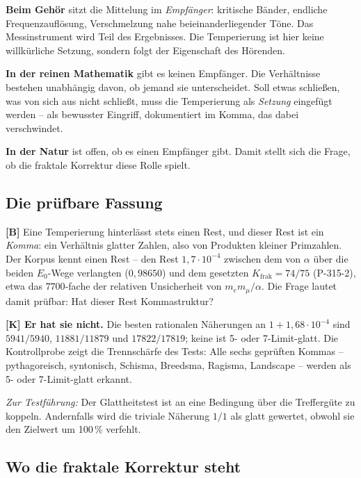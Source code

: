\textbf{Beim Geh\"or} sitzt die Mittelung im \emph{Empf\"anger}:
kritische B\"ander, endliche Frequenzaufl\"osung, Verschmelzung nahe
beieinanderliegender T\"one. Das Messinstrument wird Teil des
Ergebnisses. Die Temperierung ist hier keine willk\"urliche Setzung,
sondern folgt der Eigenschaft des H\"orenden.

\textbf{In der reinen Mathematik} gibt es keinen Empf\"anger. Die
Verh\"altnisse bestehen unabh\"angig davon, ob jemand sie unterscheidet.
Soll etwas schlie\ss en, was von sich aus nicht schlie\ss t, muss die
Temperierung als \emph{Setzung} eingef\"ugt werden -- als bewusster
Eingriff, dokumentiert im Komma, das dabei verschwindet.

\textbf{In der Natur} ist offen, ob es einen Empf\"anger gibt. Damit
stellt sich die Frage, ob die fraktale Korrektur diese Rolle spielt.

\subsection{Die pr\"ufbare Fassung}

\textbf{[B]} Eine Temperierung hinterl\"asst stets einen Rest, und
dieser Rest ist ein \emph{Komma}: ein Verh\"altnis glatter Zahlen, also
von Produkten kleiner Primzahlen. Der Korpus kennt einen Rest -- den
Rest $1{,}7\cdot10^{-4}$ zwischen dem von $\alpha$ \"uber die beiden $E_0$-Wege verlangten
($0{,}98650$) und dem gesetzten $K_\text{frak} = 74/75$ (P-315-2), etwa das $7700$-fache der relativen
Unsicherheit von $m_e m_\mu/\alpha$. Die
Frage lautet damit pr\"ufbar: Hat dieser Rest Kommastruktur?

\textbf{[K] Er hat sie nicht.} Die besten rationalen N\"aherungen an
$1 + 1{,}68\cdot10^{-4}$ sind $5941/5940$, $11881/11879$ und
$17822/17819$; keine ist 5- oder 7-Limit-glatt. Die Kontrollprobe zeigt die
Trennsch\"arfe des Tests: Alle sechs gepr\"uften Kommas --
pythagoreisch, syntonisch, Schisma, Breedsma, Ragisma, Landscape --
werden als 5- oder 7-Limit-glatt erkannt.

\emph{Zur Testf\"uhrung:} Der Glattheitstest ist an eine Bedingung
\"uber die Trefferg\"ute zu koppeln. Andernfalls wird die triviale
N\"aherung $1/1$ als glatt gewertet, obwohl sie den Zielwert um
100\,\% verfehlt.

\subsection{Wo die fraktale Korrektur steht}

